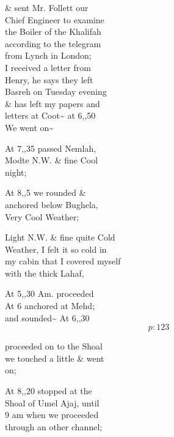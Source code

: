 \documentclass{report}
\begin{document}
	\par{
 	\& sent Mr. Follett our\ \\Chief Engineer to examine\ \\the Boiler of the Khalifah\ \\according to the telegram\ \\from Lynch in London;\ \\I received a letter from\ \\Henry, he says they left\ \\Basreh on Tuesday evening\ \\\& has left my papers and\ \\letters at Coot\~{} at 6,,50\ \\We went on\~{}\ \\
	}

	\par{
 	At 7,,35 passed Nemlah,\ \\Modte N.W. \& fine Cool\ \\night;\ \\
	}

	\par{
 	At 8,,5 we rounded \&\ \\anchored below Bughela,\ \\Very Cool Weather;\ \\
	}

	\par{
 	Light N.W. \& fine quite Cold\ \\Weather, I felt it so cold in\ \\my cabin that I covered myself\ \\with the thick Lahaf,\ \\
	}

	\par{
 	At 5,,30 Am. proceeded\ \\At 6 anchored at Mehd;\ \\and sounded\~{} At 6,,30\ \\
  \[p: 123 \]

	}


	\par{
 	proceeded on to the Shoal\ \\we touched a little \& went\ \\on;\ \\
	}

	\par{
 	At 8,,20 stopped at the\ \\Shoal of Umel Ajaj, until\ \\9 am when we proceeded\ \\through an other channel;\ \\
	}
\end{document}
